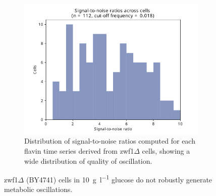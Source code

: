 \begin{figure}
  \begin{subfigure}[t]{0.4\textwidth}
   \centering
   \includegraphics[width=\textwidth]{zwf1egf_409_10.pdf}
   \caption{
    Distribution of signal-to-noise ratios computed for each flavin time series derived from zwf1$\Delta$ cells, showing a wide distribution of quality of oscillation.
   }
   \label{fig:biology-zwf1-snr}
  \end{subfigure}%

  \caption{
    zwf1$\Delta$ (BY4741) cells in \SI{10}{\gram~\litre^{-1}} glucose do not robustly generate metabolic oscillations.
  }
  \label{fig:biology-zwf1}
\end{figure}


